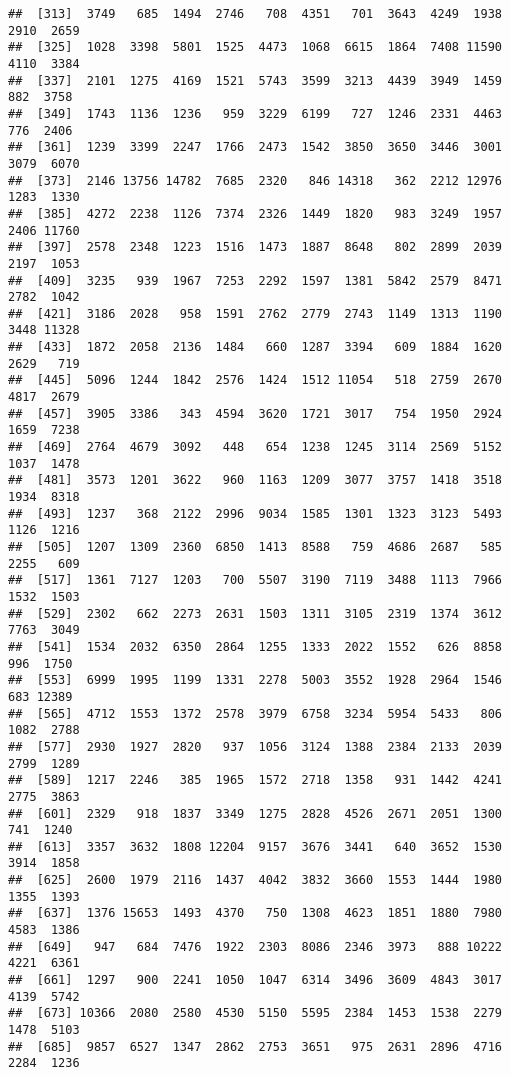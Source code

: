\documentclass[
]{article}
\begin{document}
\begin{verbatim}
##  [313]  3749   685  1494  2746   708  4351   701  3643  4249  1938  2910  2659
##  [325]  1028  3398  5801  1525  4473  1068  6615  1864  7408 11590  4110  3384
##  [337]  2101  1275  4169  1521  5743  3599  3213  4439  3949  1459   882  3758
##  [349]  1743  1136  1236   959  3229  6199   727  1246  2331  4463   776  2406
##  [361]  1239  3399  2247  1766  2473  1542  3850  3650  3446  3001  3079  6070
##  [373]  2146 13756 14782  7685  2320   846 14318   362  2212 12976  1283  1330
##  [385]  4272  2238  1126  7374  2326  1449  1820   983  3249  1957  2406 11760
##  [397]  2578  2348  1223  1516  1473  1887  8648   802  2899  2039  2197  1053
##  [409]  3235   939  1967  7253  2292  1597  1381  5842  2579  8471  2782  1042
##  [421]  3186  2028   958  1591  2762  2779  2743  1149  1313  1190  3448 11328
##  [433]  1872  2058  2136  1484   660  1287  3394   609  1884  1620  2629   719
##  [445]  5096  1244  1842  2576  1424  1512 11054   518  2759  2670  4817  2679
##  [457]  3905  3386   343  4594  3620  1721  3017   754  1950  2924  1659  7238
##  [469]  2764  4679  3092   448   654  1238  1245  3114  2569  5152  1037  1478
##  [481]  3573  1201  3622   960  1163  1209  3077  3757  1418  3518  1934  8318
##  [493]  1237   368  2122  2996  9034  1585  1301  1323  3123  5493  1126  1216
##  [505]  1207  1309  2360  6850  1413  8588   759  4686  2687   585  2255   609
##  [517]  1361  7127  1203   700  5507  3190  7119  3488  1113  7966  1532  1503
##  [529]  2302   662  2273  2631  1503  1311  3105  2319  1374  3612  7763  3049
##  [541]  1534  2032  6350  2864  1255  1333  2022  1552   626  8858   996  1750
##  [553]  6999  1995  1199  1331  2278  5003  3552  1928  2964  1546   683 12389
##  [565]  4712  1553  1372  2578  3979  6758  3234  5954  5433   806  1082  2788
##  [577]  2930  1927  2820   937  1056  3124  1388  2384  2133  2039  2799  1289
##  [589]  1217  2246   385  1965  1572  2718  1358   931  1442  4241  2775  3863
##  [601]  2329   918  1837  3349  1275  2828  4526  2671  2051  1300   741  1240
##  [613]  3357  3632  1808 12204  9157  3676  3441   640  3652  1530  3914  1858
##  [625]  2600  1979  2116  1437  4042  3832  3660  1553  1444  1980  1355  1393
##  [637]  1376 15653  1493  4370   750  1308  4623  1851  1880  7980  4583  1386
##  [649]   947   684  7476  1922  2303  8086  2346  3973   888 10222  4221  6361
##  [661]  1297   900  2241  1050  1047  6314  3496  3609  4843  3017  4139  5742
##  [673] 10366  2080  2580  4530  5150  5595  2384  1453  1538  2279  1478  5103
##  [685]  9857  6527  1347  2862  2753  3651   975  2631  2896  4716  2284  1236

\end{verbatim}
\end{document}
